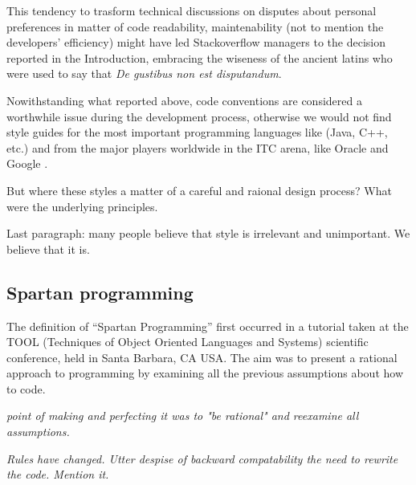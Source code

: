 This tendency to trasform technical discussions on disputes about personal preferences 
in matter of code readability, maintenability (not to mention the developers' efficiency) might 
have led Stackoverflow managers to the decision reported in the Introduction, embracing the 
wiseness of the ancient latins who were used to say that \emph{De gustibus non est disputandum}.

Nowithstanding what reported above, code conventions are considered a worthwhile issue during 
the development process, otherwise we would not find style guides for the most important 
programming languages like (Java, C++, etc.) and from the major players worldwide in 
the ITC arena, like Oracle and Google \cite{}. 

But where these styles a matter of a careful and raional design process?
What were the underlying principles.

Last paragraph: many people believe that style is irrelevant and unimportant.
We believe that it is.

\subsection{Spartan programming}


The definition of ``Spartan Programming'' first occurred in a tutorial taken at 
the TOOL (Techniques of Object Oriented Languages and Systems) scientific conference, 
held in Santa Barbara, CA USA. %
The aim was to present a rational approach to programming by examining all the previous 
assumptions about how to code.

\emph{point of making and perfecting it was to "be rational" and
reexamine all assumptions.}

\emph{Rules have changed.
Utter despise of backward compatability the need to rewrite the code.
Mention it.} 


